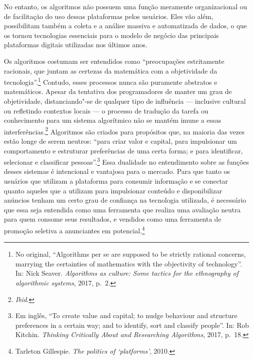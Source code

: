 No entanto, os algoritmos não possuem uma função meramente
organizacional ou de facilitação do uso dessas plataformas pelos
usuários. Eles vão além, possibilitam também a coleta e a análise
massiva e automatizada de dados, o que os tornou tecnologias essenciais
para o modelo de negócio das principais plataformas digitais utilizadas
nos últimos anos.

Os algoritmos costumam ser entendidos como ``preocupações estritamente
racionais, que juntam as certezas da matemática com a objetividade da
tecnologia''.\footnote{No original, ``Algorithms per se are supposed to be strictly
  rational concerns, marrying the certainties of mathematics with the
  objectivity of technology''. In: Nick Seaver. \emph{Algorithms as culture: Some tactics for the
ethnography of algorithmic systems}, 2017, p.\, 2.}
Contudo, esses processos nunca são puramente abstratos e matemáticos.
Apesar da tentativa dos programadores de manter um grau de objetividade,
distanciando"-se de qualquer tipo de influência --- inclusive cultural ou
refletindo contextos locais --- o processo de tradução da tarefa ou
conhecimento para um sistema algorítmico não se mantém imune a essas
interferências.\footnote{\textit{Ibid}.} Algoritmos são criados para propósitos que, na
maioria das vezes estão longe de serem neutros: ``para criar valor e
capital, para impulsionar um comportamento e estruturar preferências de
uma certa forma; e para identificar, selecionar e classificar
pessoas''.\footnote{Em inglês, ``To create value and capital; to nudge behaviour and structure preferences in a certain way; and to identify, sort and classify people''. In: Rob Kitchin. \emph{Thinking Critically About and Researching
Algorithms}, 2017, p.\, 18.} Essa dualidade no
entendimento sobre as funções desses sistemas é intencional e vantajosa
para o mercado. Para que tanto os usuários que utilizam a plataforma
para consumir informação e se conectar quanto aqueles que a utilizam
para impulsionar conteúdo e disponibilizar anúncios tenham um certo grau
de confiança na tecnologia utilizada, é necessário que essa seja
entendida como uma ferramenta que realiza uma avaliação neutra para quem
consome seus resultados, e vendidos como uma ferramenta de promoção
seletiva a anunciantes em potencial.\footnote{Tarleton Gillespie. \emph{The politics of `platforms'}, 2010.}

